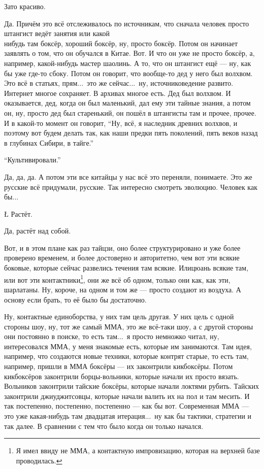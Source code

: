 \N
Зато красиво.

\A
Да. Причём это всё отслеживалось по источникам,
что сначала человек просто штангист
ведёт занятия
или какой\\нибудь там боксёр,
хороший боксёр, ну, просто боксёр.
Потом он
начинает заявлять о том, что он
обучался в Китае.
Вот. И что он
уже не просто боксёр, а, например,
какой-нибудь мастер шаолинь.
А то, что он штангист
ещё --- ну, как бы
уже где-то сбоку.
Потом он говорит, что вообще-то
дед у него был
волхвом. Это всё
в статьях, прям...\ это же сейчас...\
ну, источниковедение
развито. Интернет многое сохраняет.
В архивах многое есть.
Дед был волхвом.
И оказывается, дед, когда он был
маленький, дал ему
эти тайные знания, а потом
он, ну, просто дед был старенький,
он пошёл в штангисты там и прочее,
прочее. И в какой-то
момент он говорит, ``Ну, всё, я наследник древних
волхвов, и поэтому
вот будем делать так, как
наши предки пять
поколений, пять веков назад
в глубинах Сибири,
в тайге.''

\N
``Культивировали.''

\A
Да, да, да.
А потом эти все китайцы у нас всё это
переняли, понимаете. Это же русские
всё придумали, русские.
Так интересно смотреть эволюцию.
Человек
как бы...

\L
Растёт.

\A
Да, растёт над собой.

\I
Вот, и в этом плане как раз
тайцзи, оно более
структурировано и уже более проверено
временем, и более
достоверно и авторитетно,
чем вот эти всякие боковые, которые
сейчас развелись течения там всякие.
Илицюань
всякие там, или вот эти
контактники\footnote*{Я имел ввиду не ММА, а контактную импровизацию,
которая на верхней базе проводилась.}, они же всё об одном, только
они как, как эти,
шарлатаны. Ну, короче,
на одном и том же --- просто
создают из воздуха.
А основу если брать,
то её было бы достаточно.

\A
Ну,
контактные единоборства,
у них там
цель другая. У них цель
с одной стороны шоу,
ну, тот же самый ММА,
это же всё-таки шоу,
а с другой стороны они
постоянно в поиске,
то есть там...\ я просто
немножко читал, ну,
интересовался ММА,
у меня знакомые есть, которые им занимаются.
Там идея, например, что
создаются новые техники,
которые контрят старые,
то есть там, например,
пришли в ММА боксёры ---
их законтрили
кикбоксёры. Потом
кикбоксёров законтрили
борцы-вольники,
которые начали их просто вязать.
Вольников законтрили тайские
боксёры, которые начали локтями
рубить. Тайских законтрили
джиуджитсовцы,
которые начали
валить их на пол и там месить.
И так постепенно, постепенно, постепенно ---
как бы вот.
Современная ММА ---
это уже какая-нибудь
там двадцатая итерация...\
ну как бы тактики,
стратегии и так далее.
В сравнении с тем что было
когда он только начался.

